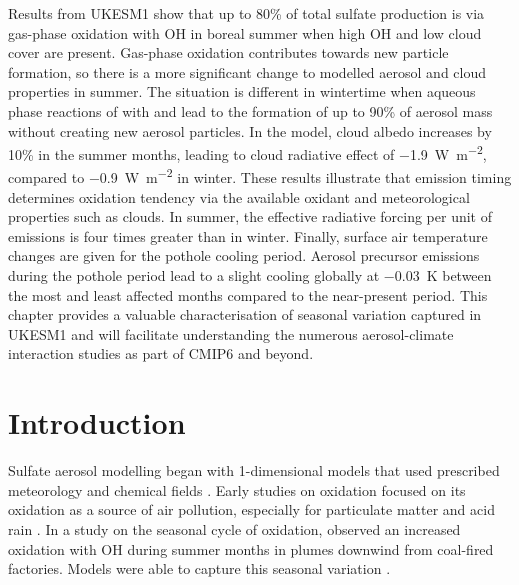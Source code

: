Results from UKESM1 show that up to 80\% of total sulfate production is via gas-phase oxidation with OH in boreal summer when high OH and low cloud cover are present. Gas-phase oxidation contributes towards new particle formation, so there is a more significant change to modelled aerosol and cloud properties in summer. The situation is different in wintertime when aqueous phase reactions of  with  and  lead to the formation of up to 90\% of aerosol mass without creating new aerosol particles. In the model, cloud albedo increases by 10\% in the summer months, leading to cloud radiative effect of \qty{-1.9}{W~m^{-2}}, compared to \qty{-0.9}{W~m^{-2}} in winter. These results illustrate that emission timing determines oxidation tendency via the available oxidant and meteorological properties such as clouds. In summer, the effective radiative forcing per unit of  emissions is four times greater than in winter. Finally, surface air temperature changes are given for the pothole cooling period. Aerosol precursor emissions during the pothole period lead to a slight cooling globally at \qty{-0.03}{\kelvin} between the most and least affected months compared to the near-present period. This chapter provides a valuable characterisation of seasonal variation captured in UKESM1 and will facilitate understanding the numerous aerosol-climate interaction studies as part of CMIP6 and beyond.


\section{Introduction}
\label{ch4:intro}

Sulfate aerosol modelling began with 1-dimensional models that used prescribed meteorology and chemical fields \citep[e.g. ][]{rodheGlobalDistributionSulfur1980, meagherSeasonalVariationAtmospheric1983,ericksoniiiGlobalOceantoatmosphereDimethyl1990}. Early studies on  oxidation focused on its oxidation as a source of air pollution, especially for particulate matter and acid rain \citep[e.g.][]{gillaniGasparticleConversionSulfur1983,eatoughConversionSO2Sulfate1994}. In a study on the seasonal cycle of  oxidation, \citet{meagherSeasonalVariationAtmospheric1983} observed an increased  oxidation with OH during summer months in plumes downwind from coal-fired factories. Models were able to capture this seasonal variation \citep{meagherSeasonalVariationAtmospheric1983,eatoughConversionSO2Sulfate1994}. 

